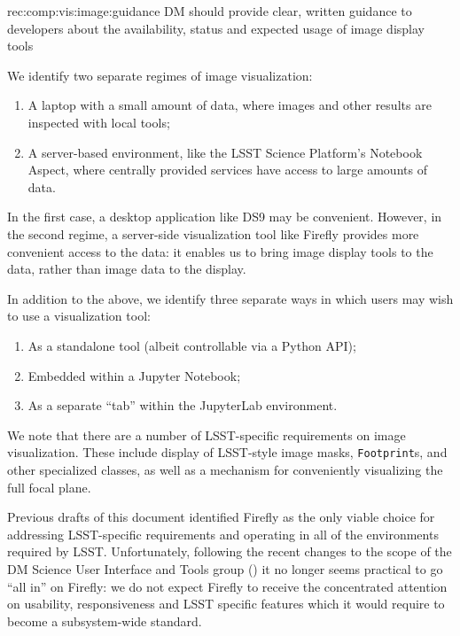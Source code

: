 \begin{recommendation}
  {rec:comp:vis:image:guidance}
  {DM should provide clear, written guidance to developers about the availability, status and expected usage of image display tools}
\end{recommendation}

We identify two separate regimes of image visualization:

\begin{enumerate}

  \item{A laptop with a small amount of data, where images and other results are inspected with local tools;}
  \item{A server-based environment, like the LSST Science Platform's Notebook Aspect, where centrally provided services have access to large amounts of data.}

\end{enumerate}

In the first case, a desktop application like DS9 may be convenient.
However, in the second regime, a server-side visualization tool like Firefly provides more convenient access to the data: it enables us to bring image display tools to the data, rather than image data to the display.

In addition to the above, we identify three separate ways in which users may wish to use a visualization tool:

\begin{enumerate}

  \item{As a standalone tool (albeit controllable via a Python API);}
  \item{Embedded within a Jupyter Notebook;}
  \item{As a separate ``tab'' within the JupyterLab environment.}

\end{enumerate}

We note that there are a number of LSST-specific requirements on image visualization.
These include display of LSST-style image masks, \texttt{Footprint}s, and other specialized classes, as well as a mechanism for conveniently visualizing the full focal plane.

Previous drafts of this document identified Firefly as the only viable choice for addressing LSST-specific requirements and operating in all of the environments required by LSST.
Unfortunately, following the recent changes to the scope of the DM Science User Interface and Tools group () it no longer seems practical to go ``all in'' on Firefly: we do not expect Firefly to receive the concentrated attention on usability, responsiveness and LSST specific features which it would require to become a subsystem-wide standard.

